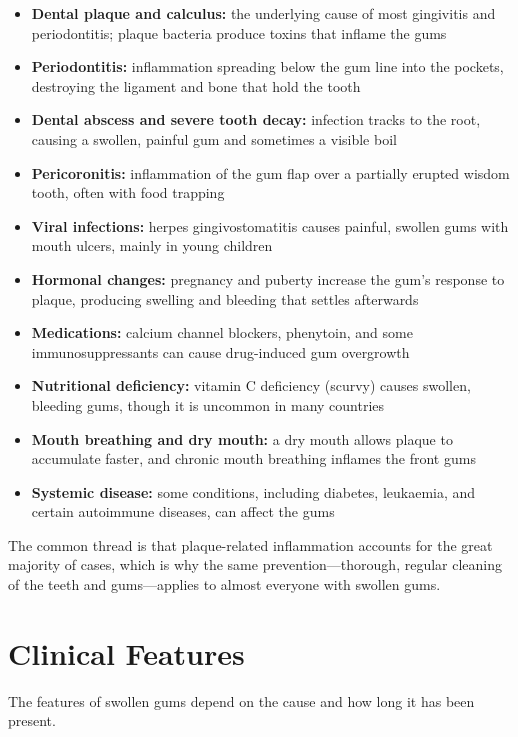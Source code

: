 \begin{itemize}
    \item \textbf{Dental plaque and calculus:} the underlying cause of most gingivitis and periodontitis; plaque bacteria produce toxins that inflame the gums
    \item \textbf{Periodontitis:} inflammation spreading below the gum line into the pockets, destroying the ligament and bone that hold the tooth
    \item \textbf{Dental abscess and severe tooth decay:} infection tracks to the root, causing a swollen, painful gum and sometimes a visible boil
    \item \textbf{Pericoronitis:} inflammation of the gum flap over a partially erupted wisdom tooth, often with food trapping
    \item \textbf{Viral infections:} herpes gingivostomatitis causes painful, swollen gums with mouth ulcers, mainly in young children
    \item \textbf{Hormonal changes:} pregnancy and puberty increase the gum's response to plaque, producing swelling and bleeding that settles afterwards
    \item \textbf{Medications:} calcium channel blockers, phenytoin, and some immunosuppressants can cause drug-induced gum overgrowth
    \item \textbf{Nutritional deficiency:} vitamin C deficiency (scurvy) causes swollen, bleeding gums, though it is uncommon in many countries
    \item \textbf{Mouth breathing and dry mouth:} a dry mouth allows plaque to accumulate faster, and chronic mouth breathing inflames the front gums
    \item \textbf{Systemic disease:} some conditions, including diabetes, leukaemia, and certain autoimmune diseases, can affect the gums
\end{itemize}

The common thread is that plaque-related inflammation accounts for the great majority of cases, which is why the same prevention---thorough, regular cleaning of the teeth and gums---applies to almost everyone with swollen gums.
\section*{Clinical Features}
The features of swollen gums depend on the cause and how long it has been present.

